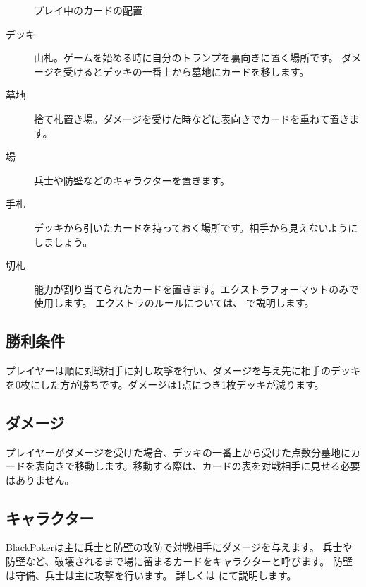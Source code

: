\documentclass[letterpaper,10pt,dvipdfmx]{sphinxmanual}
\begin{document}
\begin{figure}[htbp]
\centering
\capstart

\noindent{}
\caption{プレイ中のカードの配置}\label{\detokenize{common/01-base:id12}}\label{\detokenize{common/01-base:field-ex}}\end{figure}
\begin{description}
\item[{デッキ}] \leavevmode
山札。ゲームを始める時に自分のトランプを裏向きに置く場所です。
ダメージを受けるとデッキの一番上から墓地にカードを移します。

\item[{墓地}] \leavevmode
捨て札置き場。ダメージを受けた時などに表向きでカードを重ねて置きます。

\item[{場}] \leavevmode
兵士や防壁などのキャラクターを置きます。

\item[{手札}] \leavevmode
デッキから引いたカードを持っておく場所です。相手から見えないようにしましょう。

\item[{切札}] \leavevmode
能力が割り当てられたカードを置きます。エクストラフォーマットのみで使用します。
エクストラのルールについては、 {\hyperref[\detokenize{common/06-extra:extra}]{}} で説明します。

\end{description}


\subsection{勝利条件}
\label{\detokenize{common/01-base:id7}}
プレイヤーは順に対戦相手に対し攻撃を行い、ダメージを与え先に相手のデッキを0枚にした方が勝ちです。ダメージは1点につき1枚デッキが減ります。


\subsection{ダメージ}
\label{\detokenize{common/01-base:id8}}
プレイヤーがダメージを受けた場合、デッキの一番上から受けた点数分墓地にカードを表向きで移動します。移動する際は、カードの表を対戦相手に見せる必要はありません。


\subsection{キャラクター}
\label{\detokenize{common/01-base:id9}}
BlackPokerは主に兵士と防壁の攻防で対戦相手にダメージを与えます。
兵士や防壁など、破壊されるまで場に留まるカードをキャラクターと呼びます。
防壁は守備、兵士は主に攻撃を行います。
詳しくは {\hyperref[\detokenize{common/04-character::doc}]{}} にて説明します。
\end{document}
